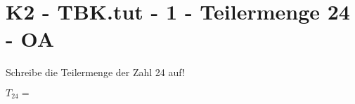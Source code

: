 \section{K2 - TBK.tut - 1 - Teilermenge 24 - OA}

\begin{beispiel}{1} %
				Schreibe die Teilermenge der Zahl 24 auf!\leer
				
				$T_{24}=$ 
\end{beispiel}